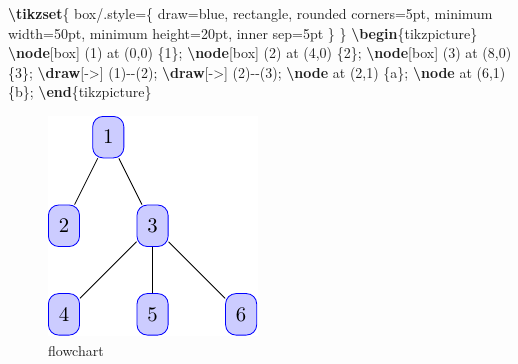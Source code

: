 \documentclass[
]{book}
\newenvironment{Shaded}{\begin{snugshade}}{\end{snugshade}}
\newcommand{\ExtensionTok}[1]{#1}
\newcommand{\FunctionTok}[1]{\textcolor[rgb]{0.13,0.29,0.53}{\textbf{#1}}}
\newcommand{\KeywordTok}[1]{\textcolor[rgb]{0.13,0.29,0.53}{\textbf{#1}}}
\newcommand{\NormalTok}[1]{#1}
\theoremstyle{definition}
\theoremstyle{definition}
\theoremstyle{definition}
\theoremstyle{definition}
\theoremstyle{remark}
\begin{document}
\begin{Shaded}
\begin{Highlighting}[]
\FunctionTok{\textbackslash{}tikzset}\NormalTok{\{}
\NormalTok{  box/.style=\{}
\NormalTok{    draw=blue,}
\NormalTok{    rectangle,}
\NormalTok{    rounded corners=5pt,}
\NormalTok{    minimum width=50pt,}
\NormalTok{    minimum height=20pt,}
\NormalTok{    inner sep=5pt}
\NormalTok{  \}}
\NormalTok{\}}
\KeywordTok{\textbackslash{}begin}\NormalTok{\{}\ExtensionTok{tikzpicture}\NormalTok{\}}
  \FunctionTok{\textbackslash{}node}\NormalTok{[box] (1) at (0,0) \{1\};}
  \FunctionTok{\textbackslash{}node}\NormalTok{[box] (2) at (4,0) \{2\};}
  \FunctionTok{\textbackslash{}node}\NormalTok{[box] (3) at (8,0) \{3\};}
  \FunctionTok{\textbackslash{}draw}\NormalTok{[{-}\textgreater{}] (1){-}{-}(2);}
  \FunctionTok{\textbackslash{}draw}\NormalTok{[{-}\textgreater{}] (2){-}{-}(3);}
  \FunctionTok{\textbackslash{}node}\NormalTok{ at (2,1) \{a\};}
  \FunctionTok{\textbackslash{}node}\NormalTok{ at (6,1) \{b\};}
\KeywordTok{\textbackslash{}end}\NormalTok{\{}\ExtensionTok{tikzpicture}\NormalTok{\}}
\end{Highlighting}
\end{Shaded}

\begin{figure}
\includegraphics[width=0.75\linewidth]{202401311000-TikZ_files/figure-latex/unnamed-chunk-57-1} \caption{flowchart}\label{fig:unnamed-chunk-57}
\end{figure}
\end{document}
